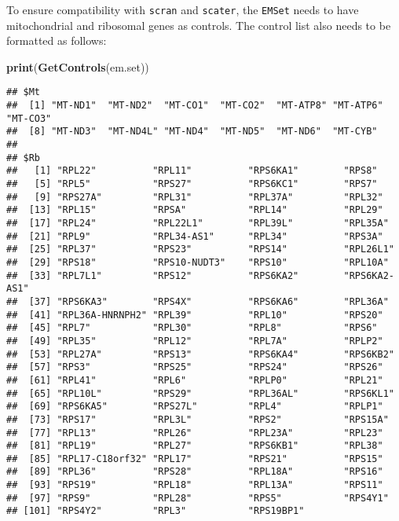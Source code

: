 \documentclass[]{article}
\newenvironment{Shaded}{\begin{snugshade}}{\end{snugshade}}
\newcommand{\KeywordTok}[1]{\textcolor[rgb]{0.13,0.29,0.53}{\textbf{#1}}}
\newcommand{\NormalTok}[1]{#1}
\begin{document}
To ensure compatibility with \texttt{scran} and \texttt{scater}, the
\texttt{EMSet} needs to have mitochondrial and ribosomal genes as
controls. The control list also needs to be formatted as follows:

\begin{Shaded}
\begin{Highlighting}[]
\KeywordTok{print}\NormalTok{(}\KeywordTok{GetControls}\NormalTok{(em.set))}
\end{Highlighting}
\end{Shaded}

\begin{verbatim}
## $Mt
##  [1] "MT-ND1"  "MT-ND2"  "MT-CO1"  "MT-CO2"  "MT-ATP8" "MT-ATP6" "MT-CO3" 
##  [8] "MT-ND3"  "MT-ND4L" "MT-ND4"  "MT-ND5"  "MT-ND6"  "MT-CYB" 
## 
## $Rb
##   [1] "RPL22"          "RPL11"          "RPS6KA1"        "RPS8"          
##   [5] "RPL5"           "RPS27"          "RPS6KC1"        "RPS7"          
##   [9] "RPS27A"         "RPL31"          "RPL37A"         "RPL32"         
##  [13] "RPL15"          "RPSA"           "RPL14"          "RPL29"         
##  [17] "RPL24"          "RPL22L1"        "RPL39L"         "RPL35A"        
##  [21] "RPL9"           "RPL34-AS1"      "RPL34"          "RPS3A"         
##  [25] "RPL37"          "RPS23"          "RPS14"          "RPL26L1"       
##  [29] "RPS18"          "RPS10-NUDT3"    "RPS10"          "RPL10A"        
##  [33] "RPL7L1"         "RPS12"          "RPS6KA2"        "RPS6KA2-AS1"   
##  [37] "RPS6KA3"        "RPS4X"          "RPS6KA6"        "RPL36A"        
##  [41] "RPL36A-HNRNPH2" "RPL39"          "RPL10"          "RPS20"         
##  [45] "RPL7"           "RPL30"          "RPL8"           "RPS6"          
##  [49] "RPL35"          "RPL12"          "RPL7A"          "RPLP2"         
##  [53] "RPL27A"         "RPS13"          "RPS6KA4"        "RPS6KB2"       
##  [57] "RPS3"           "RPS25"          "RPS24"          "RPS26"         
##  [61] "RPL41"          "RPL6"           "RPLP0"          "RPL21"         
##  [65] "RPL10L"         "RPS29"          "RPL36AL"        "RPS6KL1"       
##  [69] "RPS6KA5"        "RPS27L"         "RPL4"           "RPLP1"         
##  [73] "RPS17"          "RPL3L"          "RPS2"           "RPS15A"        
##  [77] "RPL13"          "RPL26"          "RPL23A"         "RPL23"         
##  [81] "RPL19"          "RPL27"          "RPS6KB1"        "RPL38"         
##  [85] "RPL17-C18orf32" "RPL17"          "RPS21"          "RPS15"         
##  [89] "RPL36"          "RPS28"          "RPL18A"         "RPS16"         
##  [93] "RPS19"          "RPL18"          "RPL13A"         "RPS11"         
##  [97] "RPS9"           "RPL28"          "RPS5"           "RPS4Y1"        
## [101] "RPS4Y2"         "RPL3"           "RPS19BP1"
\end{verbatim}
\end{document}

